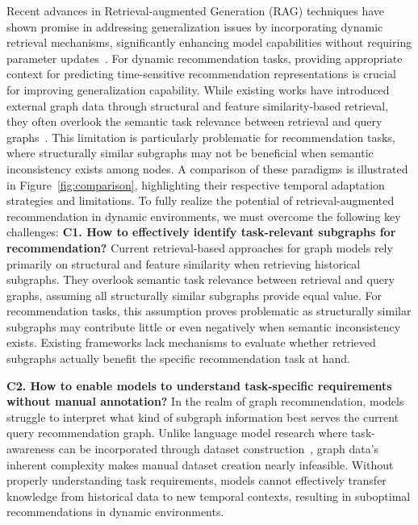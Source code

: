 \documentclass[letterpaper]{article} %
\begin{document}
Recent advances in Retrieval-augmented Generation (RAG) techniques have shown promise in addressing generalization issues by incorporating dynamic retrieval mechanisms, significantly enhancing model capabilities without requiring parameter updates~\cite{wu2024retrieval, zheng2025retrieval, parashar2024neglected,jiang2025hykge}. For dynamic recommendation tasks, providing appropriate context for predicting time-sensitive recommendation representations is crucial for improving generalization capability. While existing works have introduced external graph data through structural and feature similarity-based retrieval, they often overlook the semantic task relevance between retrieval and query graphs~\cite{jiang2024ragraph}. This limitation is particularly problematic for recommendation tasks, where structurally similar subgraphs may not be beneficial when semantic inconsistency exists among nodes. 
A comparison of these paradigms is illustrated in Figure~\ref{fig:comparison}, highlighting their respective temporal adaptation strategies and limitations. To fully realize the potential of retrieval-augmented recommendation in dynamic environments, we must overcome the following key challenges:
\textbf{C1. How to effectively identify task-relevant subgraphs for recommendation?} Current retrieval-based approaches for graph models rely primarily on structural and feature similarity when retrieving historical subgraphs. They overlook semantic task relevance between retrieval and query graphs, assuming all structurally similar subgraphs provide equal value. For recommendation tasks, this assumption proves problematic as structurally similar subgraphs may contribute little or even negatively when semantic inconsistency exists. Existing frameworks lack mechanisms to evaluate whether retrieved subgraphs actually benefit the specific recommendation task at hand.

\textbf{C2. How to enable models to understand task-specific requirements without manual annotation?} In the realm of graph recommendation, models struggle to interpret what kind of subgraph information best serves the current query recommendation graph. Unlike language model research where task-awareness can be incorporated through dataset construction~\cite{qiao2025agentic,sun2025vision,liu2024datasets}, graph data's inherent complexity makes manual dataset creation nearly infeasible. Without properly understanding task requirements, models cannot effectively transfer knowledge from historical data to new temporal contexts, resulting in suboptimal recommendations in dynamic environments.
\end{document}
